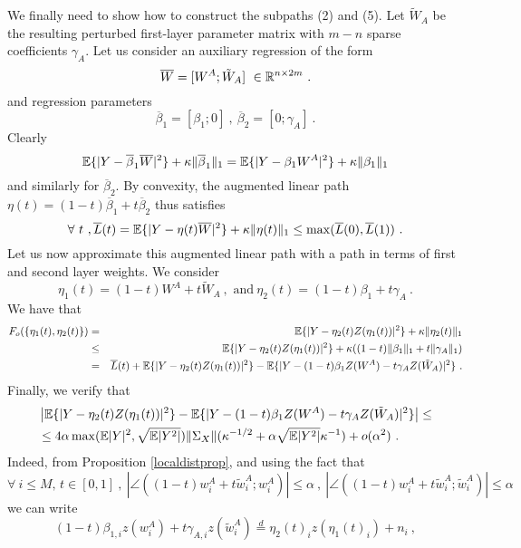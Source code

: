 We finally need to show how to construct the subpaths (2) and (5).
Let $\tilde{W}_A$ be the resulting perturbed first-layer parameter matrix 
with $m-n$ sparse coefficients $\gamma_A$.
Let us consider an auxiliary regression of the form 
$$\overline{W} = [ W^A ; \tilde{W}_A] ~\in {\mathbb{R}}^{n \times 2m}~.$$
and regression parameters 
$$\overline{\beta}_1 = [ \beta_1; 0]~,~\overline{\beta}_2 = [0; \gamma_A]~.$$
Clearly 
$${\mathbb{E}}\{ | Y - \overline{\beta}_1 \overline{W} |^2 \} + \kappa \| \overline{\beta}_1 \|_1 = {\mathbb{E}}\{ | Y - \beta_1 W^A |^2 \} + \kappa \| {\beta}_1 \|_1 $$ 
 and similarly for $\overline{\beta}_2$. By convexity, the augmented linear path $\eta(t) =(1- t) \overline{\beta}_1 + t \overline{\beta}_2$ thus satisfies 
$$\forall~t~,\overline{L}(t) = {\mathbb{E}}\{ | Y - \eta(t) \overline{W} |^2 \} + \kappa \| \eta(t) \|_1 \leq \max(\overline{L}(0), \overline{L}(1))~. $$
Let us now approximate this augmented linear path with a path in terms of first and second layer weights. 
We consider
$$\eta_1(t) = (1-t) W^A + t \tilde{W}_A~,\text{ and}~\eta_2(t) = (1- t) {\beta}_1 + t \gamma_A~.$$
We have that 
\begin{eqnarray}
\label{bub1}
F_{o}(\{ \eta_1(t), \eta_2(t) \}) &=& {\mathbb{E}} \{ | Y - \eta_2(t) Z(\eta_1(t) ) |^2 \} + \kappa \| \eta_2(t) \|_1  \\ 
&\leq & {\mathbb{E}} \{ | Y - \eta_2(t) Z(\eta_1(t) ) |^2 \} + \kappa(  ( 1-t) \| {\beta}_1\|_1 + t \| \gamma_A \|_1 ) \nonumber \\
& = & \overline{L}(t) + {\mathbb{E}} \{ | Y - \eta_2(t) Z(\eta_1(t) ) |^2 \}  - {\mathbb{E}} \{ | Y - (1-t) \beta_1 Z(W^A) - t \gamma_A Z(\tilde{W}_A) |^2 \} ~.  \nonumber
\end{eqnarray}
Finally, we verify that
{\small 
\begin{eqnarray}
\label{bub2}
& \left | {\mathbb{E}} \{ | Y - \eta_2(t) Z(\eta_1(t) ) |^2 \}  - {\mathbb{E}} \{ | Y - (1-t) \beta_1 Z(W^A) - t \gamma_A Z(\tilde{W}_A) |^2 \} \right|  \leq\\
& \leq 4  \alpha \max({\mathbb{E}} |Y|^2, \sqrt{{\mathbb{E}}|Y^2|}) \| \Sigma_X \| ( \kappa^{-1/2} + \alpha \sqrt{{\mathbb{E}}|Y^2|} \kappa^{-1}) + o(\alpha^2)~. \nonumber
\end{eqnarray}}
Indeed, from Proposition \ref{localdistprop}, and using the fact that 
$$\forall~i\leq M,\, t \in [0,1]~,~\left| \angle( (1-t)w^A_i + t \tilde{w}^A_i ; w^A_i) \right| \leq \alpha~,~ \left| \angle( (1-t)w^A_i + t \tilde{w}^A_i ; \tilde{w}^A_i) \right| \leq \alpha $$
we can write 
$$(1-t) \beta_{1,i} z(w^A_i) + t \gamma_{A,i} z(\tilde{w}^A_i) \stackrel{d}{=} \eta_2(t)_i z(\eta_1(t)_i) + n_i ~,$$
